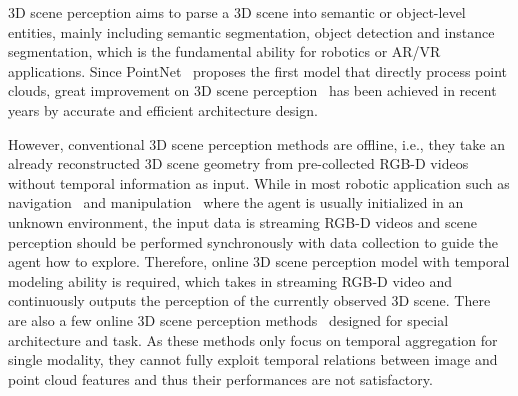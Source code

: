 
3D scene perception aims to parse a 3D scene into semantic or object-level entities, mainly including semantic segmentation, object detection and instance segmentation, which is the fundamental ability for robotics or AR/VR applications. 
Since PointNet~\cite{qi2017pointnet} proposes the first model that directly process point clouds, great improvement on 3D scene perception~\cite{choy20194d,rukhovich2022fcaf3d,wang2022cagroup3d,schult2022mask3d,vu2022softgroup} has been achieved in recent years by accurate and efficient architecture design.

However, conventional 3D scene perception methods are offline, i.e., they take an already reconstructed 3D scene geometry from pre-collected RGB-D videos without temporal information as input. While in most robotic application such as navigation~\cite{chaplot2020object,zhang20233d} and manipulation~\cite{Mousavian_2019_ICCV} where the agent is usually initialized in an unknown environment, the input data is streaming RGB-D videos and scene perception should be performed synchronously with data collection to guide the agent how to explore. Therefore, online 3D scene perception model with temporal modeling ability is required, which takes in streaming RGB-D video and continuously outputs the perception of the currently observed 3D scene.
There are also a few online 3D scene perception methods~\cite{mccormac2017semanticfusion,narita2019panopticfusion,zhang2020fusion,huang2021supervoxel,liu2022ins} designed for special architecture and task. 
As these methods only focus on temporal aggregation for single modality, they cannot fully exploit temporal relations between image and point cloud features and thus their performances are not satisfactory. 

